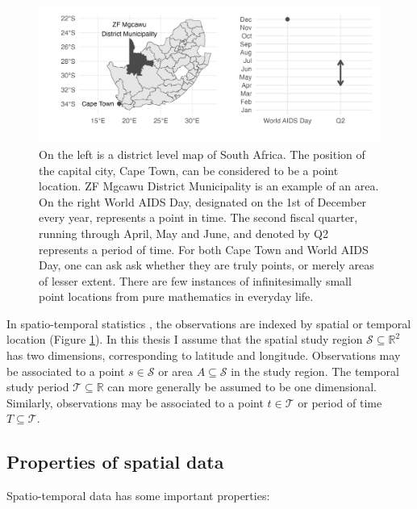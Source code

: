 \documentclass[a4paper, nobind]{templates/ociamthesis}
\begin{document}
\begin{figure}

{\centering \includegraphics[width=0.95\linewidth]{figures/bayesian/st} 

}

\caption{On the left is a district level map of South Africa. The position of the capital city, Cape Town, can be considered to be a point location. ZF Mgcawu District Municipality is an example of an area. On the right World AIDS Day, designated on the 1st of December every year, represents a point in time. The second fiscal quarter, running through April, May and June, and denoted by Q2 represents a period of time. For both Cape Town and World AIDS Day, one can ask ask whether they are truly points, or merely areas of lesser extent. There are few instances of infinitesimally small point locations from pure mathematics in everyday life.}\label{fig:st}
\end{figure}

In spatio-temporal statistics \autocite{cressie2015statistics}, the observations are indexed by spatial or temporal location (Figure \ref{fig:st}).
In this thesis I assume that the spatial study region \(\mathcal{S} \subseteq \mathbb{R}^2\) has two dimensions, corresponding to latitude and longitude.
Observations may be associated to a point \(s \in \mathcal{S}\) or area \(A \subseteq \mathcal{S}\) in the study region.
The temporal study period \(\mathcal{T} \subseteq \mathbb{R}\) can more generally be assumed to be one dimensional.
Similarly, observations may be associated to a point \(t \in \mathcal{T}\) or period of time \(T \subseteq \mathcal{T}\).

\hypertarget{properties-of-spatial-data}{%
\subsection{Properties of spatial data}\label{properties-of-spatial-data}}

Spatio-temporal data has some important properties:
\end{document}
